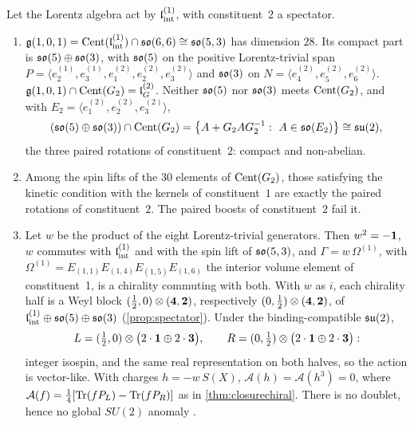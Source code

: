 \begin{proposition}
\label{e5:prop:spectator}
Let the Lorentz algebra act by $\mathfrak l_{\rm int}^{(1)}$, with constituent~$2$ a spectator.
\begin{enumerate}[label=(\roman*),leftmargin=2.2em]
\item $\mathfrak g(1,0,1)=\operatorname{Cent}(\mathfrak l_{\rm int}^{(1)})\cap\mathfrak{so}(6,6)\cong\mathfrak{so}(5,3)$ has dimension $28$. Its compact part is $\mathfrak{so}(5)\oplus\mathfrak{so}(3)$, with $\mathfrak{so}(5)$ on the
positive Lorentz-trivial span $P=\langle e^{(1)}_2,e^{(1)}_3,e^{(2)}_1,e^{(2)}_2,e^{(2)}_3\rangle$ and $\mathfrak{so}(3)$ on $N=\langle e^{(2)}_4,e^{(2)}_5,e^{(2)}_6\rangle$.
$\mathfrak g(1,0,1)\cap\operatorname{Cent}(G_2)=\mathfrak l_G^{(2)}$. Neither $\mathfrak{so}(5)$ nor $\mathfrak{so}(3)$ meets $\operatorname{Cent}(G_2)$, and with $E_2=\langle e^{(2)}_1,e^{(2)}_2,e^{(2)}_3\rangle$,
\[
(\so5\oplus\so3)\cap\Cent(G_2)=\bigl\{A+G_2AG_2^{-1}:\ A\in\so{E_2}\bigr\}\cong\su2 ,
\]
the three paired rotations of constituent~$2$: compact and non-abelian.
\item Among the spin lifts of the $30$ elements of $\operatorname{Cent}(G_2)$, those satisfying the kinetic condition with the kernels of constituent~$1$ are
exactly the paired rotations of constituent~$2$. The paired boosts of constituent~$2$ fail it.
\item Let $w$ be the product of the eight Lorentz-trivial generators. Then $w^2=-\mathbf 1$, $w$ commutes with $\mathfrak l_{\rm int}^{(1)}$ and with the spin lift of
$\mathfrak{so}(5,3)$, and $\Gamma=w\,\Omega^{(1)}$, with $\Omega^{(1)}=E_{(1,1)}E_{(1,4)}E_{(1,5)}E_{(1,6)}$ the interior volume element of
constituent~1, is a chirality commuting with both. With $w$ as $i$, each chirality half is a Weyl block $(\tfrac12,0)\otimes(\mathbf4,\mathbf2)$, respectively $(0,\tfrac12)\otimes(\mathbf4,\mathbf2)$, of
$\mathfrak l_{\rm int}^{(1)}\oplus\mathfrak{so}(5)\oplus\mathfrak{so}(3)$ (\cref{prop:spectator}). Under the binding-compatible $\mathfrak{su}(2)$,
\[
L=(\tfrac12,0)\otimes\bigl(2\cdot\mathbf1\oplus2\cdot\mathbf3\bigr),\qquad R=(0,\tfrac12)\otimes\bigl(2\cdot\mathbf1\oplus2\cdot\mathbf3\bigr):
\]
integer isospin, and the same real representation on both halves, so the action is vector-like. With charges $h=-w\,S(X)$,
$\mathcal A(h)=\mathcal A(h^3)=0$, where $\mathcal A(f)=\tfrac14[\operatorname{Tr}(fP_L)-\operatorname{Tr}(fP_R)]$ as in \cref{thm:closurechiral}. There is no doublet, hence no
global $SU(2)$ anomaly \cite{Witten82}.
\end{enumerate}
\end{proposition}

